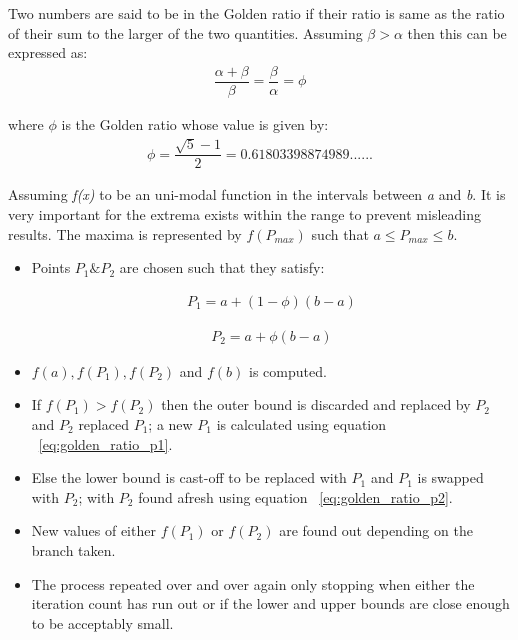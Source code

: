 {Two numbers are said to be in the Golden ratio if their ratio is same as the ratio of their sum to the larger of the two quantities. Assuming $\beta > \alpha$ then this can be expressed as\cite{Gill81MurrayWright}:\\

\begin{equation}
	\begin{aligned}
		\dfrac{\alpha+\beta}{\beta}=\dfrac{\beta}{\alpha}=\phi
		\label{eq:golden_ratio1}
	\end{aligned}
\end{equation}

where ${\phi}$ is the Golden ratio whose value is given by:\\

\begin{equation}
	\begin{aligned}
		 \phi=\dfrac{\sqrt{5}-1}{2}= 0.61803398874989......
		\label{eq:golden_ratio}
	\end{aligned}
\end{equation}
 
 Assuming \textit{f(x)} to be an uni-modal function in the intervals between  \textit{a} and \textit{b}. It is very important for the extrema exists within the range to prevent misleading results. The maxima is represented by $\textit{f}(P_{\textit{max}})$ such that $a\leq P_{\textit{max}} \leq b $.
 \begin{itemize}
 
 \item Points $P_{1} \& P_{2}$ are chosen such that they satisfy:
 
\begin{equation}
	\begin{aligned}
		 P_{1}=a+(1-\phi)(b-a)
		\label{eq:golden_ratio_p1}
	\end{aligned}
\end{equation}

\begin{equation}
	\begin{aligned}
		 P_{2}=a+\phi(b-a)
		\label{eq:golden_ratio_p2}
	\end{aligned}
\end{equation}


	\item $\textit{f}(a),\textit{f}(P_{1}),\textit{f}(P_{2})$ and $\textit{f}(b)$ is computed.
	\item If $\textit{f}(P_{1}) > \textit{f}(P_{2})$ then the outer bound is discarded and replaced by $ P_{2} $ and $ P_{2}$ replaced $ P_{1}$; a new $ P_{1}$ is calculated using equation ~\ref{eq:golden_ratio_p1}.
	\item Else the lower bound is cast-off to be replaced with $ P_{1}$ and $ P_{1}$ is swapped with $ P_{2}$; with $ P_{2}$ found afresh using equation ~\ref{eq:golden_ratio_p2}.
	\item New values of either $\textit{f}(P_{1})$ or $\textit{f}(P_{2})$ are found out depending on the branch taken.
	\item  The process repeated over and over again only stopping when either the iteration count has run out or if the lower and upper bounds are close enough to be acceptably small. 
\end{itemize}

}
